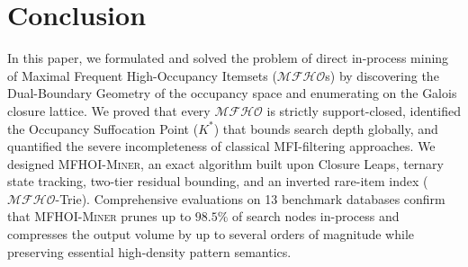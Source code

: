 \documentclass[runningheads,orivec]{llncs}
\newcommand{\MFHO}{\ensuremath{\mathcal{MFHO}}}
\newcommand{\MFHOI}{\ensuremath{\mathcal{MFHO}}}
\newcommand{\MFHOIMiner}{\textsc{MFHOI-Miner}}
\begin{document}
\section{Conclusion}
\label{sec:conclusion}

In this paper, we formulated and solved the problem of direct in-process mining of Maximal Frequent High-Occupancy Itemsets (\MFHOI{}s) by discovering the Dual-Boundary Geometry of the occupancy space and enumerating on the Galois closure lattice. We proved that every $\MFHOI$ is strictly support-closed, identified the Occupancy Suffocation Point ($K^*$) that bounds search depth globally, and quantified the severe incompleteness of classical MFI-filtering approaches. We designed \MFHOIMiner{}, an exact algorithm built upon Closure Leaps, ternary state tracking, two-tier residual bounding, and an inverted rare-item index (\MFHO{}-Trie). Comprehensive evaluations on 13 benchmark databases confirm that \MFHOIMiner{} prunes up to $98.5\%$ of search nodes in-process and compresses the output volume by up to several orders of magnitude while preserving essential high-density pattern semantics.



\end{document}
